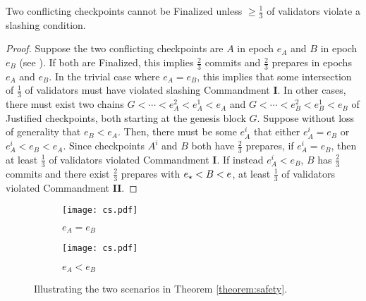 \documentclass[12pt]{article}
\newcommand{\epoch}{\ensuremath{e}\xspace}
\newcommand{\epochsource}{\ensuremath{\epoch_{\star}}\space}
\newcommand{\Genesisblock}{\ensuremath{G}\xspace}
\begin{document}
\begin{theorem}
\label{theorem:safety}
Two conflicting checkpoints cannot be Finalized unless $\geq \frac{1}{3}$ of validators violate a slashing condition.

\begin{proof}
Suppose the two conflicting checkpoints are $A$ in epoch $\epoch_A$ and $B$ in epoch $\epoch_B$ (see ). If both are Finalized, this implies $\frac{2}{3}$ commits and $\frac{2}{3}$ prepares in epochs $\epoch_A$ and $e_B$. In the trivial case where $\epoch_A = \epoch_B$, this implies that some intersection of $\frac{1}{3}$ of validators must have violated slashing Commandment \textbf{I}. In other cases, there must exist two chains $\Genesisblock < \cdots < \epoch_A^2 < \epoch_A^1 < \epoch_A$ and $\Genesisblock < \cdots < \epoch_B^2 < \epoch_B^1 < \epoch_B$ of Justified checkpoints, both starting at the genesis block $\Genesisblock$. Suppose without loss of generality that $\epoch_B < \epoch_A$. Then, there must be some $\epoch_A^i$ that either $\epoch_A^i = \epoch_B$ or $\epoch_A^i < \epoch_B < \epoch_A$.  Since checkpoints $A^i$ and $B$ both have $\frac{2}{3}$ prepares, if $\epoch_A^i = \epoch_B$, then at least $\frac{1}{3}$ of validators violated Commandment \textbf{I}.  If instead $\epoch_A^i < \epoch_B$, $B$ has $\frac{2}{3}$ commits and there exist $\frac{2}{3}$ prepares with $\epochsource < B < \epoch$, at least $\frac{1}{3}$ of validators violated Commandment \textbf{II}. 
\end{proof}
\end{theorem}


\begin{figure}[h!tb]
\centering
   \begin{subfigure}[b]{0.45\textwidth}
   \centering
   \texttt{[image: cs.pdf]}
	\label{fig:2a}
	\caption{$\epoch_A = \epoch_B$}
	\end{subfigure} \hspace{0.05\textwidth} \begin{subfigure}[b]{0.45\textwidth}
   \centering
   \texttt{[image: cs.pdf]}
	\label{fig:2b}
	\caption{$\epoch_A < \epoch_B$}
	\end{subfigure}
\label{fig:conflicting_checkpoints}
\caption{Illustrating the two scenarios in Theorem \ref{theorem:safety}.}
\end{figure}
\end{document}
